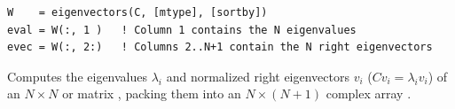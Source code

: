 
\lstset{language=[95]Fortran}
\begin{lstlisting}
W    = eigenvectors(C, [mtype], [sortby])
eval = W(:, 1 )   ! Column 1 contains the N eigenvalues
evec = W(:, 2:)   ! Columns 2..N+1 contain the N right eigenvectors
\end{lstlisting}

Computes the eigenvalues $\lambda_i$ and normalized right eigenvectors $v_i$ ($C v_i = \lambda_i v_i$) of an $N\times N$  or  matrix , packing them into an $N\times (N+1)$ complex array .

